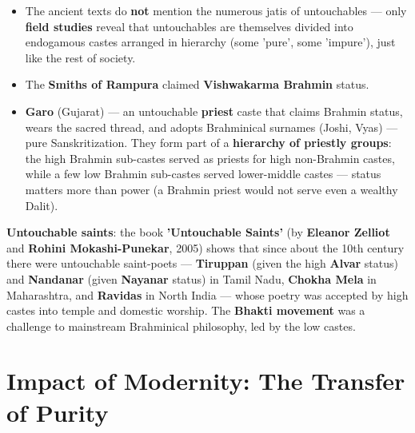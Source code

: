 \begin{KeyConcept}
\begin{itemize}
\item The ancient texts do \textbf{not} mention the numerous jatis of untouchables --- only \textbf{field studies} reveal that untouchables are themselves divided into endogamous castes arranged in hierarchy (some 'pure', some 'impure'), just like the rest of society.
\item The \textbf{Smiths of Rampura} claimed \textbf{Vishwakarma Brahmin} status.
\item \textbf{Garo} (Gujarat) --- an untouchable \textbf{priest} caste that claims Brahmin status, wears the sacred thread, and adopts Brahminical surnames (Joshi, Vyas) --- pure Sanskritization. They form part of a \textbf{hierarchy of priestly groups}: the high Brahmin sub-castes served as priests for high non-Brahmin castes, while a few low Brahmin sub-castes served lower-middle castes --- status matters more than power (a Brahmin priest would not serve even a wealthy Dalit).
\end{itemize}
\end{KeyConcept}

\begin{ExampleBox}
\textbf{Untouchable saints}: the book \textbf{'Untouchable Saints'} (by \textbf{Eleanor Zelliot} and \textbf{Rohini Mokashi-Punekar}, 2005) shows that since about the 10th century there were untouchable saint-poets --- \textbf{Tiruppan} (given the high \textbf{Alvar} status) and \textbf{Nandanar} (given \textbf{Nayanar} status) in Tamil Nadu, \textbf{Chokha Mela} in Maharashtra, and \textbf{Ravidas} in North India --- whose poetry was accepted by high castes into temple and domestic worship. The \textbf{Bhakti movement} was a challenge to mainstream Brahminical philosophy, led by the low castes.
\end{ExampleBox}

\section{Impact of Modernity: The Transfer of Purity}


